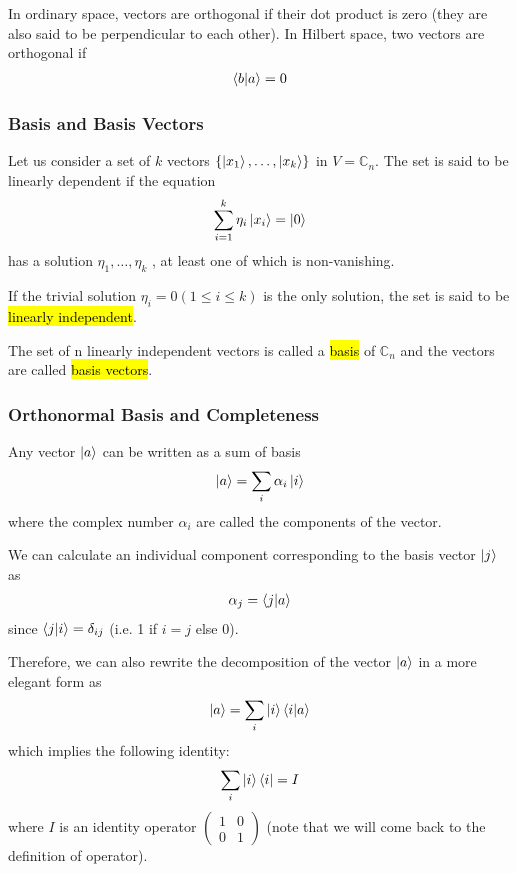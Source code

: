 In ordinary space, vectors are orthogonal if their dot product is zero (they are also said to be perpendicular to each other). In Hilbert space, two vectors are orthogonal if
\begin{align*}
    \braket{b|a}=0
\end{align*}

\subsubsection{Basis and Basis Vectors}
Let us consider a set of $k$ vectors $\left\{ \ket{x_1}, \dots,\ket{x_k} \right\}$ in $V = \mathbb{C}_n$. The set is said to be linearly dependent if the equation
\begin{align*}
    \sum_{i=1}^k \eta_i \ket{x_i}=\ket{0} 
\end{align*}
has a solution $\eta_1,\dots,\eta_k$ , at least one of which is non-vanishing. 

If the trivial solution $\eta_i = 0 (1 \le i \le k)$ is the only solution, the set is said to be \hl{linearly independent}.

The set of n linearly independent vectors is called a \hl{basis} of $\mathbb{C}_n$ and the vectors are called \hl{basis vectors}. 

\subsubsection{Orthonormal Basis and Completeness}

Any vector $\ket{a}$ can be written as a sum of basis
\begin{align*}
    \ket{a}=\sum_i \alpha_i \ket{i}
\end{align*}
where the complex number $\alpha_i$ are called the components of the vector.

We can calculate an individual component corresponding to the basis vector $\ket{j}$ as
\begin{align*}
    \alpha_j=\braket{j|a}
\end{align*}
since $\braket{j|i}=\delta_{ij}$ (i.e. 1 if $i=j$ else 0). 

Therefore, we can also rewrite the decomposition of the vector $\ket{a}$ in a more elegant form as
\begin{align*}
    \ket{a}=\sum_i \ket{i} \braket{i|a}
\end{align*}
which implies the following identity:
\begin{align*}
    \sum_i \ket{i}\bra{i}=I
\end{align*}
where $I$ is an identity operator $\begin{pmatrix}
    1 & 0 \\ 0 & 1
\end{pmatrix}$ (note that we will come back to the definition of operator).

